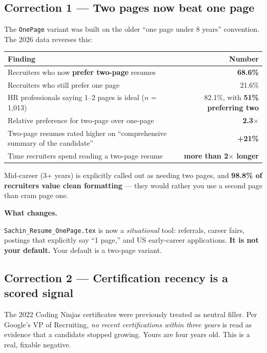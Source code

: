 \documentclass[11pt,a4paper]{article}
\newcommand{\keyfinding}[1]{\par\vspace{3pt}\noindent\textcolor{warn}{\textbf{#1}}\par\vspace{2pt}}
\begin{document}
\subsection{Correction 1 --- Two pages now beat one page}

The \texttt{OnePage} variant was built on the older ``one page under 8 years'' convention.
The 2026 data reverses this:

\begin{center}
\begin{tabular}{p{10cm} r}
\hline
\textbf{Finding} & \textbf{Number} \\
\hline
Recruiters who now \textbf{prefer two-page} resumes & \textbf{68.6\%} \\
Recruiters who still prefer one page & 21.6\% \\
HR professionals saying 1--2 pages is ideal ($n$ = 1{,}013) & 82.1\%, with \textbf{51\% preferring two} \\
Relative preference for two-page over one-page & \textbf{2.3$\times$} \\
Two-page resumes rated higher on ``comprehensive summary of the candidate'' & \textbf{+21\%} \\
Time recruiters spend reading a two-page resume & \textbf{more than 2$\times$ longer} \\
\hline
\end{tabular}
\end{center}

Mid-career (3+ years) is explicitly called out as needing two pages, and \textbf{98.8\% of
recruiters value clean formatting} --- they would rather you use a second page than cram
page one.

\keyfinding{What changes.}
\texttt{Sachin\_Resume\_OnePage.tex} is now a \emph{situational} tool: referrals, career
fairs, postings that explicitly say ``1 page,'' and US early-career applications. \textbf{It
is not your default.} Your default is a two-page variant.

\subsection{Correction 2 --- Certification recency is a scored signal}

The 2022 Coding Ninjas certificates were previously treated as neutral filler. Per Google's
VP of Recruiting, \emph{no recent certifications within three years} is read as evidence that
a candidate stopped growing. Yours are four years old. This is a real, fixable negative.
\end{document}
